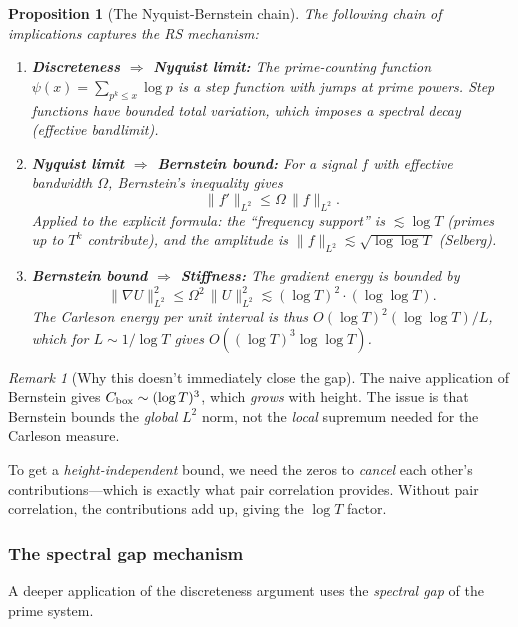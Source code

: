 \documentclass[11pt]{article}
\newtheorem{proposition}[theorem]{Proposition}
\theoremstyle{definition}
\theoremstyle{remark}
\newtheorem{remark}[theorem]{Remark}
\theoremstyle{definition}
\begin{document}
\begin{proposition}[The Nyquist-Bernstein chain]\label{prop:nyquist-bernstein}
The following chain of implications captures the RS mechanism:
\begin{enumerate}
\item \textbf{Discreteness $\Rightarrow$ Nyquist limit:} The prime-counting function $\psi(x) = \sum_{p^k \le x} \log p$ is a \emph{step function} with jumps at prime powers. Step functions have bounded total variation, which imposes a spectral decay (effective bandlimit).

\item \textbf{Nyquist limit $\Rightarrow$ Bernstein bound:} For a signal $f$ with effective bandwidth $\Omega$, Bernstein's inequality gives
\[
  \|f'\|_{L^2} \le \Omega\,\|f\|_{L^2}.
\]
Applied to the explicit formula: the ``frequency support'' is $\lesssim \log T$ (primes up to $T^k$ contribute), and the amplitude is $\|f\|_{L^2} \lesssim \sqrt{\log\log T}$ (Selberg).

\item \textbf{Bernstein bound $\Rightarrow$ Stiffness:} The gradient energy is bounded by
\[
  \|\nabla U\|_{L^2}^2 \le \Omega^2\,\|U\|_{L^2}^2 \lesssim (\log T)^2 \cdot (\log\log T).
\]
The Carleson energy per unit interval is thus $O(\log T)^2(\log\log T) / L$, which for $L \sim 1/\log T$ gives $O((\log T)^3 \log\log T)$.
\end{enumerate}
\end{proposition}

\begin{remark}[Why this doesn't immediately close the gap]
The naive application of Bernstein gives $C_{\rm box} \sim (\log T)^3$, which \emph{grows} with height. The issue is that Bernstein bounds the \emph{global} $L^2$ norm, not the \emph{local} supremum needed for the Carleson measure.

To get a \emph{height-independent} bound, we need the zeros to \emph{cancel} each other's contributions---which is exactly what pair correlation provides. Without pair correlation, the contributions add up, giving the $\log T$ factor.
\end{remark}

\subsubsection*{The spectral gap mechanism}

A deeper application of the discreteness argument uses the \emph{spectral gap} of the prime system.
\end{document}

